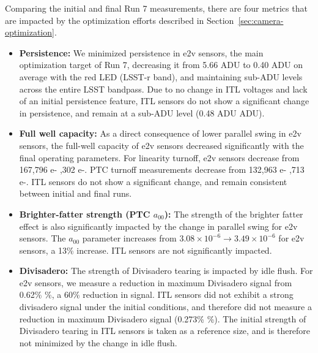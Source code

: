 Comparing the initial and final Run 7 measurements, there are four metrics that are impacted by the optimization efforts described in Section~\ref{sec:camera-optimization}.
\begin{itemize}
  \item \textbf{Persistence:} We minimized persistence in e2v sensors, the main optimization target of Run 7, decreasing it from 5.66 ADU to 0.40 ADU on average with the red LED (LSST-r band), and maintaining sub-ADU levels across the entire LSST bandpass. Due to no change in ITL voltages and lack of an initial persistence feature, ITL sensors do not show a significant change in persistence, and remain at a sub-ADU level (0.48 ADU  ADU).
  \item \textbf{Full well capacity:} As a direct consequence of lower parallel swing in e2v sensors, the full-well capacity of e2v sensors decreased significantly with the final operating parameters. For linearity turnoff, e2v sensors decrease from 167,796 e- ,302 e-. PTC turnoff measurements decrease from 132,963 e- ,713 e-. ITL sensors do not show a significant change, and remain consistent between initial and final runs.
  \item \textbf{Brighter-fatter strength (PTC $a_{00}$):} The strength of the brighter fatter effect is also significantly impacted by the change in parallel swing for e2v sensors. The $a_{00}$ parameter increases from $3.08\times10^{-6} \rightarrow 3.49\times10^{-6}$ for e2v sensors, a 13\% increase. ITL sensors are not significantly impacted.%
  \item \textbf{Divisadero:} The strength of Divisadero tearing is impacted by idle flush. For e2v sensors, we measure a reduction in maximum Divisadero signal from 0.62\% \%, a 60\% reduction in signal. ITL sensors did not exhibit a strong divisadero signal under the initial conditions, and therefore did not measure a reduction in maximum Divisadero signal (0.273\% \%). The initial strength of Divisadero tearing in ITL sensors is taken as a reference size, and is therefore not minimized by the change in idle flush.
\end{itemize}

